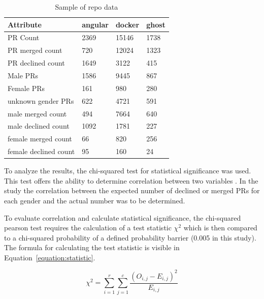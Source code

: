 \begin{table}[!t]
	\renewcommand{\arraystretch}{1.3}
	\caption{Sample of repo data}
	\label{table:sampledata}
	\centering

	\begin{tabular} { l | l | l | l  }
		\textbf{Attribute} 			& 	\textbf{angular}		&	\textbf{docker}	&	\textbf{ghost}	\\ \hline

		PR Count		&2369	&	15146&1738 \\
		PR merged count 	&720	&	12024&1323 \\
		PR declined count 	&1649	&	3122 &415  \\
		Male PRs		&1586	&	9445 &867  \\
		Female PRs		&161	&	980  &280  \\
		unknown gender PRs	&622	&	4721 &591  \\
		male merged count  	&494	&	7664 &640  \\
		male declined count	&1092	&	1781 &227  \\
		female merged count	&66	&	820  &256  \\
		female declined count	&95	&	160  &24   \\


	\end{tabular}
\end{table}

To analyze the results, the chi-squared test for statistical significance was used. This test offers the ability to determine correlation between two variables  \cite[p.102ff.]{chi2016springer}. In the study the correlation between the expected number of declined or merged \ac{PR}s for each gender and the actual number was to be determined.

To evaluate correlation and calculate statistical significance, the chi-squared pearson test requires the calculation of a test statistic $ \chi^2 $ which is then compared to a chi-squared probability of a defined probability barrier (0.005 in this study). The formula for calculating the test statistic is visible in Equation~\ref{equation:statistic}.

\begin{equation}
    \label{equation:statistic}
\chi^2= \sum_{i=1}^{r} \sum_{j=1}^{c} \frac{(O_{i,j} - E_{i,j})^2}{E_{i,j}}
\end{equation}

